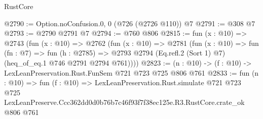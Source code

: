 \begin{lexlean}{RustCore}
\begin{coremodule}
@2790 := Option.noConfusion.{0, 0} (@726 (@2726 @110)) @7
@2791 := @308 @7
@2793 := @2790 @2791 @7
@2794 := @760 @806
@2815 := fun (x : @10) =>
  @2743
    (fun (x : @10) =>
    @2762
      (fun (x : @10) =>
      @2781
        (fun (x : @10) =>
        fun (fn : @7) =>
        fun (h : @2785) =>
        @2793 @2794 (Eq.refl.{2} (Sort 1) @7) (heq_of_eq.{1} @746 @2791 @2794 @761))))
@2823 := (n : @10) -> (f : @10) -> LexLeanPreservation.Rust.FunSem @721 @723 @725 @806 @761
@2833 := fun (n : @10) =>
  fun (f : @10) =>
  LexLeanPreservation.Rust.simulate
    @721
    @723
    @725
    LexLeanPreserve.Ccc362dd0d0b76b7c46f93f7f38ec125e.R3.RustCore.crate_ok
    @806
    @761
\end{coremodule}
\end{lexlean}
